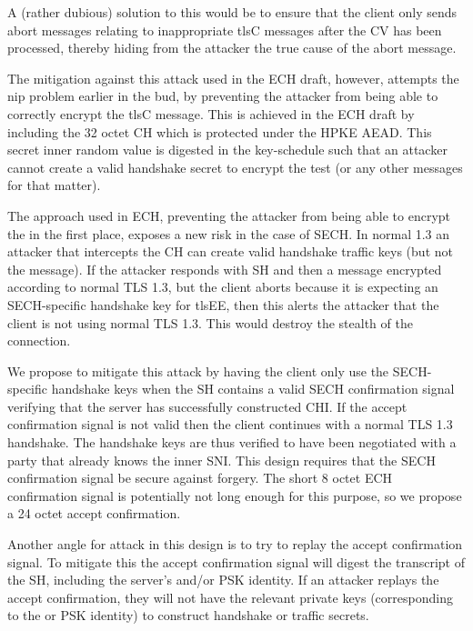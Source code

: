 A (rather dubious) solution to this would be
to ensure that the client only sends abort
messages relating to inappropriate \ac{tlsC} messages after the \ac{CV} has been processed,
thereby hiding from the attacker the true cause of the abort message.

The mitigation against this attack used in the \ac{ECH} draft, however, attempts the nip problem earlier in the bud, by preventing the attacker from being able to correctly encrypt the \ac{tlsC} message.
This is achieved in the \ac{ECH}  draft by including the 32 octet
\ac{CH} which is protected under the \ac{HPKE} \ac{AEAD}.
This secret inner random value is digested in the key-schedule such that an attacker cannot
create a valid handshake secret to encrypt the test  (or any other messages for that matter).

The approach used in \ac{ECH}, preventing the attacker
from being able to encrypt the 
in the first place,
exposes a new risk in the case of \ac{SECH}.
In normal  1.3 an attacker that intercepts the \ac{CH}
can
create valid handshake traffic keys (but not the  message).
If the attacker responds with \ac{SH} and then a 
message encrypted according to normal \ac{TLS} 1.3,
but the client aborts because it is expecting an \ac{SECH}-specific
handshake key for \ac{tlsEE},
then this alerts the attacker that the client is not using normal \ac{TLS} 1.3.
This would destroy the stealth of the connection.

We propose to mitigate this attack
by having the client only use the
\ac{SECH}-specific handshake keys when the \ac{SH}
contains a valid \ac{SECH} confirmation signal verifying
that the server has successfully constructed \ac{CHI}.
If the accept confirmation signal is not valid then the client continues with a normal \ac{TLS} 1.3 handshake.
The handshake keys are thus verified to have been negotiated
with a party that already knows the inner \ac{SNI}.
This design requires that the \ac{SECH} confirmation
signal be secure against forgery.
The short 8 octet \ac{ECH} confirmation signal is potentially
not long enough for this purpose,
so we propose a 24 octet accept confirmation.

Another angle for attack in this design is to try to replay the accept confirmation signal.
To mitigate this the accept confirmation signal
will digest the transcript of the \ac{SH},
including the server's  and/or \ac{PSK} identity.
If an attacker replays the accept confirmation, they will not have the relevant private keys (corresponding to the  or \ac{PSK} identity)
to construct handshake or traffic secrets.


